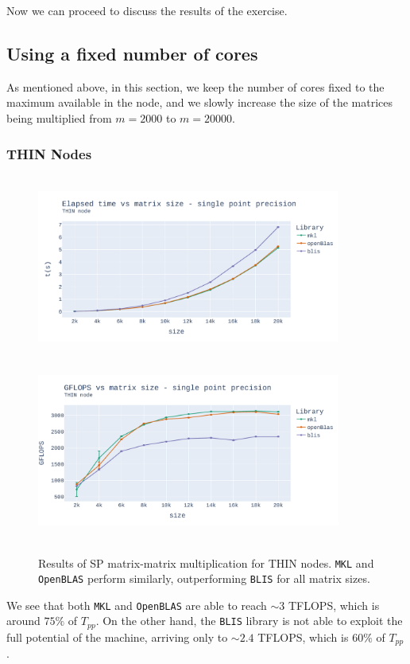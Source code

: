 \documentclass{report}
\begin{document}
Now we can proceed to discuss the results of the exercise.

\subsection{Using a fixed number of cores}

As mentioned above, in this section, we keep the number of cores fixed to the 
maximum available in the node, and we slowly increase the size of the matrices 
being multiplied from $m=2000$ to $m=20000$. 

\subsubsection{THIN Nodes}

\begin{figure}[h!]
\hspace*{-2.5cm}
\includegraphics[width=10cm, height=6cm]{./images/fixed_cores_thin_float_time.pdf}
\includegraphics[width=10cm, height=6cm]{./images/fixed_cores_thin_float_gflops.pdf}
\caption{\label{fig:fixed_cores_thin_float} Results of SP matrix-matrix multiplication 
for THIN nodes. \texttt{MKL} and \texttt{OpenBLAS} perform similarly, outperforming 
\texttt{BLIS} for all matrix sizes.}
\end{figure}
We see that both \texttt{MKL} and 
\texttt{OpenBLAS} are able to reach $\sim 3$ TFLOPS, which is around 
$75\%$ of $T_{pp}$. On the other hand, the \texttt{BLIS} library is not 
able to exploit the full potential of the machine, arriving only to 
$\sim 2.4$ TFLOPS, which is $60\%$ of $T_{pp}$.
\end{document}
